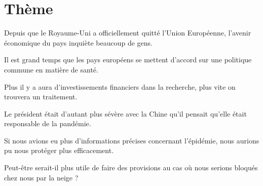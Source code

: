 \documentclass[a4paper,english,bookmarks]{article}
\begin{document}
\newboxans

\hfill\newline

\section*{\centering\EBGaramond\Large Thème}

\begin{enumerate}
    \begin{minipage}[t]{0.45\linewidth}
        \item Depuis que le Royaume-Uni a officiellement quitté l'Union Européenne, l'avenir économique du pays inquiète beaucoup de gens.
        
        
        \item Il est grand temps que les pays européens se mettent d'accord sur une politique commune en matière de santé.
        
        
        \item Plus il y a aura d'investissements financiers dans la recherche, plus vite on trouvera un traitement.
        
        
        \item Le président était d'autant plus sévère avec la Chine qu'il pensait qu'elle était responsable de la pandémie.
        
        
        \item Si nous avions eu plus d'informations précises concernant l'épidémie, nous aurions pu nous protéger plus efficacement.
        
    \end{minipage}
    \hfill
    \begin{minipage}[t]{0.45\linewidth}
        \item Peut-être serait-il plus utile de faire des provisions au cas où nous serions bloqués chez nous par la neige ?
        

\end{minipage}
\end{enumerate}
\end{document}

